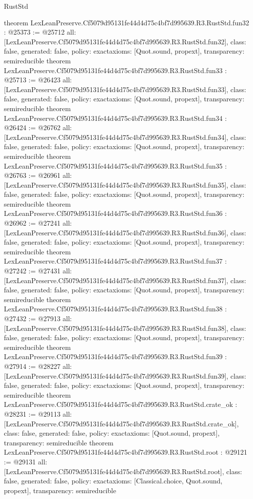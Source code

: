 \begin{lexlean}{RustStd}
\begin{coremodule}
{}
theorem LexLeanPreserve.Cf5079d95131fe44d4d75c4bf7d995639.R3.RustStd.fun32 : @25373 := @25712 {
  all: [LexLeanPreserve.Cf5079d95131fe44d4d75c4bf7d995639.R3.RustStd.fun32],
  class: false,
  generated: false,
  policy: exact{axioms: [Quot.sound, propext]},
  transparency: semireducible
}
theorem LexLeanPreserve.Cf5079d95131fe44d4d75c4bf7d995639.R3.RustStd.fun33 : @25713 := @26423 {
  all: [LexLeanPreserve.Cf5079d95131fe44d4d75c4bf7d995639.R3.RustStd.fun33],
  class: false,
  generated: false,
  policy: exact{axioms: [Quot.sound, propext]},
  transparency: semireducible
}
theorem LexLeanPreserve.Cf5079d95131fe44d4d75c4bf7d995639.R3.RustStd.fun34 : @26424 := @26762 {
  all: [LexLeanPreserve.Cf5079d95131fe44d4d75c4bf7d995639.R3.RustStd.fun34],
  class: false,
  generated: false,
  policy: exact{axioms: [Quot.sound, propext]},
  transparency: semireducible
}
theorem LexLeanPreserve.Cf5079d95131fe44d4d75c4bf7d995639.R3.RustStd.fun35 : @26763 := @26961 {
  all: [LexLeanPreserve.Cf5079d95131fe44d4d75c4bf7d995639.R3.RustStd.fun35],
  class: false,
  generated: false,
  policy: exact{axioms: [Quot.sound, propext]},
  transparency: semireducible
}
theorem LexLeanPreserve.Cf5079d95131fe44d4d75c4bf7d995639.R3.RustStd.fun36 : @26962 := @27241 {
  all: [LexLeanPreserve.Cf5079d95131fe44d4d75c4bf7d995639.R3.RustStd.fun36],
  class: false,
  generated: false,
  policy: exact{axioms: [Quot.sound, propext]},
  transparency: semireducible
}
theorem LexLeanPreserve.Cf5079d95131fe44d4d75c4bf7d995639.R3.RustStd.fun37 : @27242 := @27431 {
  all: [LexLeanPreserve.Cf5079d95131fe44d4d75c4bf7d995639.R3.RustStd.fun37],
  class: false,
  generated: false,
  policy: exact{axioms: [Quot.sound, propext]},
  transparency: semireducible
}
theorem LexLeanPreserve.Cf5079d95131fe44d4d75c4bf7d995639.R3.RustStd.fun38 : @27432 := @27913 {
  all: [LexLeanPreserve.Cf5079d95131fe44d4d75c4bf7d995639.R3.RustStd.fun38],
  class: false,
  generated: false,
  policy: exact{axioms: [Quot.sound, propext]},
  transparency: semireducible
}
theorem LexLeanPreserve.Cf5079d95131fe44d4d75c4bf7d995639.R3.RustStd.fun39 : @27914 := @28227 {
  all: [LexLeanPreserve.Cf5079d95131fe44d4d75c4bf7d995639.R3.RustStd.fun39],
  class: false,
  generated: false,
  policy: exact{axioms: [Quot.sound, propext]},
  transparency: semireducible
}
theorem LexLeanPreserve.Cf5079d95131fe44d4d75c4bf7d995639.R3.RustStd.crate_ok : @28231 := @29113 {
  all: [LexLeanPreserve.Cf5079d95131fe44d4d75c4bf7d995639.R3.RustStd.crate_ok],
  class: false,
  generated: false,
  policy: exact{axioms: [Quot.sound, propext]},
  transparency: semireducible
}
theorem LexLeanPreserve.Cf5079d95131fe44d4d75c4bf7d995639.R3.RustStd.root : @29121 := @29131 {
  all: [LexLeanPreserve.Cf5079d95131fe44d4d75c4bf7d995639.R3.RustStd.root],
  class: false,
  generated: false,
  policy: exact{axioms: [Classical.choice, Quot.sound, propext]},
  transparency: semireducible
}


\end{coremodule}
\end{lexlean}
